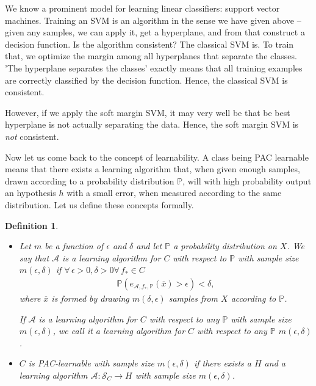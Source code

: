 \documentclass{article}
\newcommand{\calA}{\mathcal{A}}
\newcommand{\calS}{\mathcal{S}}
\newtheorem{defi}{Definition}
\begin{document}
    We know a prominent model for learning linear classifiers: support vector machines. Training an SVM is an algorithm in the sense we have given above -- given any samples, we can apply it, get a hyperplane, and from that construct a decision function. Is the algorithm consistent? The classical SVM is. To train that, we optimize the margin among all hyperplanes that separate the classes. 'The hyperplane separates the classes' exactly means that all training examples are correctly classified by the decision function. Hence, the classical SVM is consistent.

    However, if we apply the soft margin SVM, it may very well be that be best hyperplane is not actually separating the data. Hence, the soft margin SVM is \emph{not} consistent.

   

    



Now let us come back to the concept of learnability. A class being PAC learnable means that there exists a learning algorithm that, when given enough samples, drawn according to a probability distribution $\mathbb{P}$, will with high probability output an hypothesis $h$ with a small error, when measured according to the same distribution. Let us define these concepts formally.
\begin{defi}
    \begin{itemize}
        \item Let $m$ be a function of $\epsilon$ and $\delta$ and let $\mathbb{P}$ a probability distribution on $X$. We say that $\calA$ is a \emph{learning algorithm for $C$ with respect to $\mathbb{P}$ with sample size $m(\epsilon,\delta)$} if  $\forall \, \epsilon>0 , \delta>0 \forall \, f_* \in C$
        \begin{align*}
          \mathbb{P}( e_{\calA,f_*,\mathbb{P}}(\overline{x}) >\epsilon)<\delta,
        \end{align*}
        where $\overline{x}$ is formed by drawing $m(\delta,\epsilon)$ samples from $X$ according to $\mathbb{P}$. 

        If $\calA$ is a learning algorithm for $C$ with respect to any $\mathbb{P}$ with sample size $m(\epsilon,\delta)$, we call it a \emph{learning algorithm for $C$ with respect to any $\mathbb{P}$ $m(\epsilon,\delta)$.}
        \item $C$ is \emph{PAC-learnable} with sample size $m(\epsilon,\delta)$ if there exists a $H$ and a learning algorithm $\calA : \calS_C\to H$ with sample size $m(\epsilon,\delta)$. 
    \end{itemize}
\end{defi}
\end{document}
